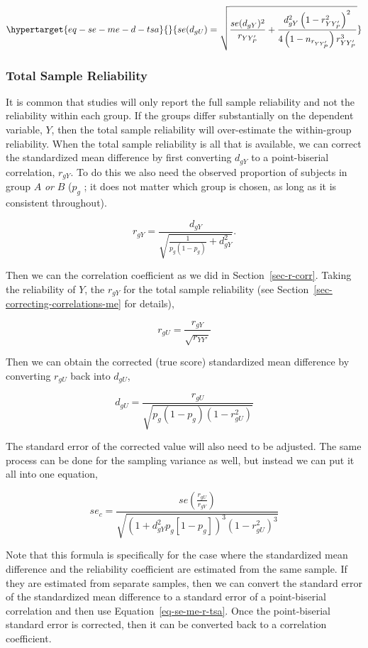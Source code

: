\documentclass[
  letterpaper,
  DIV=11,
  numbers=noendperiod]{scrreprt}
\begin{document}
\begin{equation}\protect\hypertarget{eq-se-me-d-tsa}{}{
se(d_{gU}) = \sqrt{\frac{se(d_{gY})^2}{r_{YY'_P}} +\frac{d^2_{gY}\left(1-r^2_{YY'_P}\right)^2}{4\left(1-n_{r_{YY'_P}}\right)r^3_{YY'_P}}}
}\label{eq-se-me-d-tsa}\end{equation}

\hypertarget{total-sample-reliability}{%
\subsubsection*{Total Sample
Reliability}\label{total-sample-reliability}}

It is common that studies will only report the full sample reliability
and not the reliability within each group. If the groups differ
substantially on the dependent variable, \(Y\), then the total sample
reliability will over-estimate the within-group reliability. When the
total sample reliability is all that is available, we can correct the
standardized mean difference by first converting \(d_{gY}\) to a
point-biserial correlation, \(r_{gY}\). To do this we also need the
observed proportion of subjects in group \(A\) \emph{or} \(B\) (\(p_g\)
; it does not matter which group is chosen, as long as it is consistent
throughout).

\[
r_{gY} = \frac{d_{gY}}{\sqrt{\frac{1}{p_g(1-p_g)}+d_{gY}^2}}.
\]

Then we can the correlation coefficient as we did in
Section~\ref{sec-r-corr}. Taking the reliability of \(Y\), the
\(r_{gY}\) for the total sample reliability (see
Section~\ref{sec-correcting-correlations-me} for details),

\[
r_{gU} = \frac{r_{gY}}{\sqrt{r_{YY'}}}
\]

Then we can obtain the corrected (true score) standardized mean
difference by converting \(r_{gU}\) back into \(d_{gU}\),

\[
d_{gU} = \frac{r_{gU}}{\sqrt{p_g(1-p_g)(1-r_{gU}^2)}}
\]

The standard error of the corrected value will also need to be adjusted.
The same process can be done for the sampling variance as well, but
instead we can put it all into one equation,

\[
se_{c} = \frac {se\left(\frac{r_{gU}}{r_{gY}}\right)} {\sqrt{\left(1+d_{gY}^2p_g[1-p_g]\right)^3\left(1-r_{gU}^2\right)^3}}
\]

Note that this formula is specifically for the case where the
standardized mean difference and the reliability coefficient are
estimated from the same sample. If they are estimated from separate
samples, then we can convert the standard error of the standardized mean
difference to a standard error of a point-biserial correlation and then
use Equation~\ref{eq-se-me-r-tsa}. Once the point-biserial standard
error is corrected, then it can be converted back to a correlation
coefficient.
\end{document}
